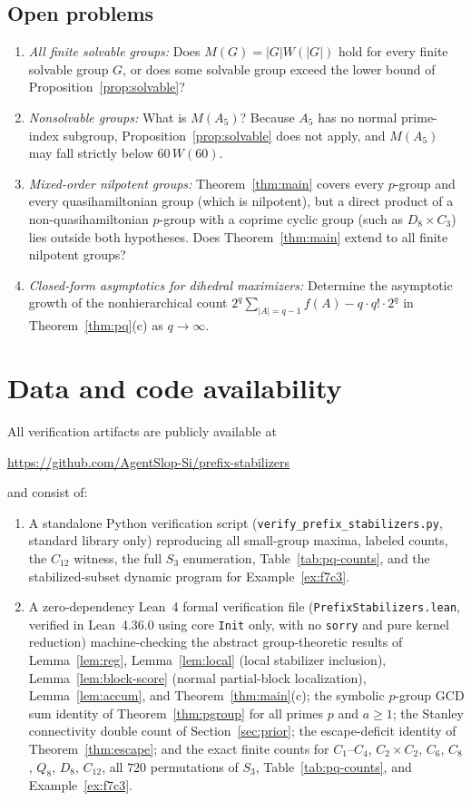 \documentclass[11pt,reqno]{amsart}
\numberwithin{equation}{section}
\theoremstyle{definition}
\theoremstyle{remark}
\begin{document}
\subsection{Open problems}
\begin{enumerate}[label=(\arabic*),leftmargin=2em]
\item \emph{All finite solvable groups:} Does $M(G)=|G|W(|G|)$ hold for every finite solvable group $G$, or does some solvable group exceed the lower bound of Proposition~\ref{prop:solvable}?
\item \emph{Nonsolvable groups:} What is $M(A_5)$? Because $A_5$ has no normal prime-index subgroup, Proposition~\ref{prop:solvable} does not apply, and $M(A_5)$ may fall strictly below $60\,W(60)$.
\item \emph{Mixed-order nilpotent groups:} Theorem~\ref{thm:main} covers every $p$-group and every quasihamiltonian group (which is nilpotent), but a direct product of a non-quasihamiltonian $p$-group with a coprime cyclic group (such as $D_8\times C_3$) lies outside both hypotheses. Does Theorem~\ref{thm:main} extend to all finite nilpotent groups?
\item \emph{Closed-form asymptotics for dihedral maximizers:} Determine the asymptotic growth of the nonhierarchical count $2^q\sum_{|A|=q-1}f(A) - q\cdot q!\cdot 2^q$ in Theorem~\ref{thm:pq}(c) as $q\to\infty$.
\end{enumerate}

\section*{Data and code availability}
All verification artifacts are publicly available at
\begin{center}
\url{https://github.com/AgentSlop-Si/prefix-stabilizers}
\end{center}
and consist of:
\begin{enumerate}[label=(\arabic*),leftmargin=2em]
\item A standalone Python verification script (\texttt{verify\_prefix\_stabilizers.py}, standard library only) reproducing all small-group maxima, labeled counts, the $C_{12}$ witness, the full $S_3$ enumeration, Table~\ref{tab:pq-counts}, and the stabilized-subset dynamic program for Example~\ref{ex:f7c3}.
\item A zero-dependency Lean~4 formal verification file (\texttt{PrefixStabilizers.lean}, verified in Lean~4.36.0 using core \texttt{Init} only, with no \texttt{sorry} and pure kernel reduction) machine-checking the abstract group-theoretic results of Lemma~\ref{lem:reg}, Lemma~\ref{lem:local} (local stabilizer inclusion), Lemma~\ref{lem:block-score} (normal partial-block localization), Lemma~\ref{lem:accum}, and Theorem~\ref{thm:main}(c); the symbolic $p$-group GCD sum identity of Theorem~\ref{thm:pgroup} for all primes $p$ and $a\ge 1$; the Stanley connectivity double count of Section~\ref{sec:prior}; the escape-deficit identity of Theorem~\ref{thm:escape}; and the exact finite counts for $C_1$--$C_4$, $C_2\times C_2$, $C_6$, $C_8$, $Q_8$, $D_8$, $C_{12}$, all $720$ permutations of $S_3$, Table~\ref{tab:pq-counts}, and Example~\ref{ex:f7c3}.
\end{enumerate}



\end{document}
